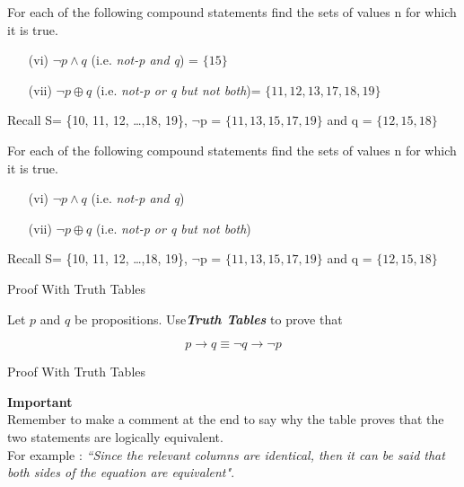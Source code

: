 \documentclass{beamer}
\begin{document}
\begin{frame}
For each of the following compound statements find the sets of values n for which it is true. 
\begin{itemize}
\item[(vi)] $\neg p \wedge q$ (i.e. \textit{not-p and q}) = $\{15\} $
\item[(vii)] $ \neg p \oplus q$ (i.e. \textit{ not-p or q but not both})= $\{11, 12, 13, 17, 18, 19\}$
\end{itemize}

Recall S= \{10, 11, 12, \ldots ,18, 19\}, $\neg$p = $\{ 11, 13, 15, 17, 19\}$  and q = $\{12,15,18\}$

For each of the following compound statements find the sets of values n for which it is true. 
\begin{itemize}
\item[(vi)] $\neg p \wedge q$ (i.e. \textit{not-p and q}) %
\item[(vii)] $ \neg p \oplus q$ (i.e. \textit{ not-p or q but not both}) %
\end{itemize}

Recall S= \{10, 11, 12, \ldots ,18, 19\}, $\neg$p = $\{ 11, 13, 15, 17, 19\}$  and q = $\{12,15,18\}$


{Proof With Truth Tables}

Let $p$ and $q$ be propositions. Use\textbf{\textit{Truth Tables}} to prove that

\[ p \rightarrow q \equiv \neg q \rightarrow \neg p\]
\end{frame}
\begin{frame}
{Proof With Truth Tables}

\textbf{Important}\\ 
Remember to make a comment at the end to say why the table proves that the two statements are logically equivalent. \\ For example : \emph{``Since the relevant columns are identical, then it can be said that both sides of the equation are equivalent"}.
\end{frame}
\end{document}
